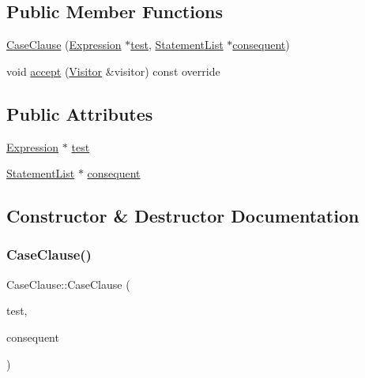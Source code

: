 \subsection*{Public Member Functions}
\begin{DoxyCompactItemize}
\item 
\hyperlink{struct_case_clause_a05d8bf165e3a4796247b5fbf1f71d3e5}{Case\+Clause} (\hyperlink{struct_expression}{Expression} $\ast$\hyperlink{struct_case_clause_a80b6f256f3d9910250e4b8433ea75d7f}{test}, \hyperlink{struct_statement_list}{Statement\+List} $\ast$\hyperlink{struct_case_clause_a3e6914411610d1893b61172521e11288}{consequent})
\item 
void \hyperlink{struct_case_clause_a5bbee9ea9ca206c09b8b79f8c96720a1}{accept} (\hyperlink{struct_visitor}{Visitor} \&visitor) const override
\end{DoxyCompactItemize}
\subsection*{Public Attributes}
\begin{DoxyCompactItemize}
\item 
\hyperlink{struct_expression}{Expression} $\ast$ \hyperlink{struct_case_clause_a80b6f256f3d9910250e4b8433ea75d7f}{test}
\item 
\hyperlink{struct_statement_list}{Statement\+List} $\ast$ \hyperlink{struct_case_clause_a3e6914411610d1893b61172521e11288}{consequent}
\end{DoxyCompactItemize}


\subsection{Constructor \& Destructor Documentation}
\mbox{\label{struct_case_clause_a05d8bf165e3a4796247b5fbf1f71d3e5}} 
\subsubsection{\texorpdfstring{Case\+Clause()}{CaseClause()}}
{\footnotesize\ttfamily Case\+Clause\+::\+Case\+Clause (\begin{DoxyParamCaption}\item[{\hyperlink{struct_expression}{Expression} $\ast$}]{test,  }\item[{\hyperlink{struct_statement_list}{Statement\+List} $\ast$}]{consequent }\end{DoxyParamCaption})\hspace{0.3cm}{\ttfamily [inline]}}



